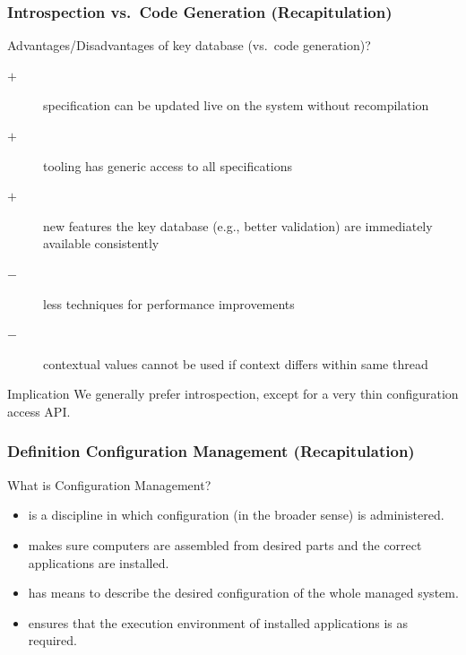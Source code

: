 \begin{frame}
	\frametitle{Introspection vs.\ Code Generation (Recapitulation)}

	\begin{task}
	Advantages/Disadvantages of key database (vs.\ code generation)?
	\end{task}

	\pause

	\begin{description}
	\item[$+$] specification can be updated live on the system without recompilation
	\item[$+$] tooling has generic access to all specifications
 	\item[$+$] new features the key database (e.g., better validation) are immediately available consistently
	\item[$-$] less techniques for performance improvements
	\item[$-$] contextual values cannot be used if context differs within same thread
	\end{description}

	\begin{alertblock}{Implication}
	We generally prefer introspection, except for a very thin configuration access API.
	\end{alertblock}
\end{frame}

\begin{frame}
	\frametitle{Definition Configuration Management (Recapitulation)}

	\begin{task}
	What is Configuration Management?
	\end{task}

	\pause

	\begin{itemize}
	\item is a discipline in which configuration (in the broader sense) is administered.
	\item makes sure computers are assembled from desired parts and the correct applications are installed.
	\item has means to describe the desired configuration of the whole managed system.
	\item ensures that the execution environment of installed applications is as required.
	\end{itemize}
\end{frame}

